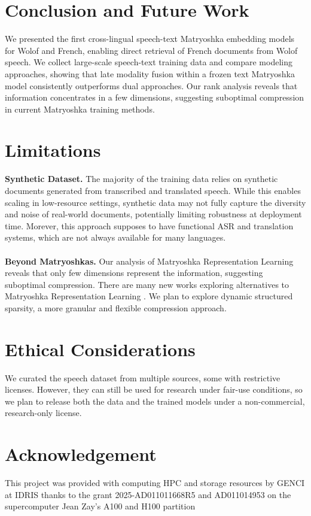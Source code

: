 \documentclass[11pt]{article}
\newcommand{\myparagraph}[1]{\noindent\textbf{#1}}
\begin{document}
\section{Conclusion and Future Work}
We presented the first cross-lingual speech-text Matryoshka embedding models for Wolof and French, enabling direct retrieval of French documents from Wolof speech. We collect large-scale speech-text training data and compare modeling approaches, showing that late modality fusion within a frozen text Matryoshka model consistently outperforms dual approaches. Our rank analysis reveals that information concentrates in a few dimensions, suggesting suboptimal compression in current Matryoshka training methods.

\section{Limitations}

\myparagraph{Synthetic Dataset.} The majority of the training data relies on synthetic documents generated from transcribed and translated speech. While this enables scaling in low-resource settings, synthetic data may not fully capture the diversity and noise of real-world documents, potentially limiting robustness at deployment time. Morever, this approach supposes to have functional ASR and translation systems, which are not always available for many languages.
\\
\\
\myparagraph{Beyond Matryoshkas.} Our analysis of Matryoshka Representation Learning reveals that only few dimensions represent the information, suggesting suboptimal compression. There are many new works exploring alternatives to Matryoshka Representation Learning \citep{wen2025Matryoshkarevisitingsparsecoding}. We plan to explore dynamic structured sparsity, a more granular and flexible compression approach.
\section{Ethical Considerations}
We curated the speech dataset from multiple sources, some with restrictive licenses. However, they can still be used for research under fair-use conditions, so we plan to release both the data and the trained models under a non-commercial, research-only license.
\section{Acknowledgement}
This project was provided with computing HPC and storage resources by GENCI at IDRIS thanks to the grant 2025-AD011011668R5 and AD011014953 on the supercomputer Jean Zay’s A100 and H100 partition

\appendix
\end{document}
